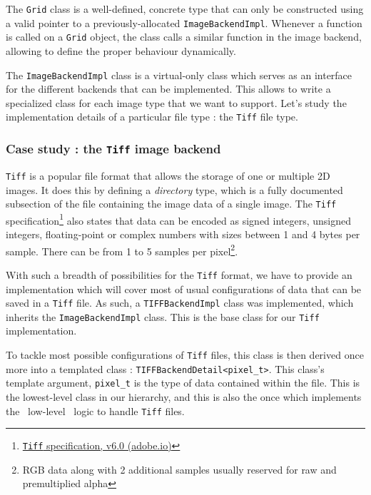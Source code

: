 {{		\myparspace

		The \texttt{Grid} class is a well-defined, concrete type that can only be constructed using a valid pointer to a previously-allocated \texttt{ImageBackendImpl}. Whenever a function is called on a \texttt{Grid} object, the class calls a similar function in the image backend, allowing to define the proper behaviour dynamically.\par
		The \texttt{ImageBackendImpl} class is a virtual-only class which serves as an interface for the different backends that can be implemented. This allows to write a specialized class for each image type that we want to support. Let's study the implementation details of a particular file type : the \texttt{Tiff} file type.

		\subsubsection{Case study : the \texttt{Tiff} image backend}
		{
			\texttt{Tiff} is a popular file format that allows the storage of one or multiple 2D images. It does this by defining a \textit{directory} type, which is a fully documented subsection of the file containing the image data of a single image. The \texttt{Tiff} specification\footnote{\href{https://www.adobe.io/content/dam/udp/en/open/standards/tiff/TIFF6.pdf}{\texttt{Tiff} specification, v6.0 (adobe.io)}} also states that data can be encoded as signed integers, unsigned integers, floating-point or complex numbers with sizes between 1 and 4 bytes per sample. There can be from 1 to 5 samples per pixel\footnote{RGB data along with 2 additional samples usually reserved for raw and premultiplied alpha}.

			With such a breadth of possibilities for the \texttt{Tiff} format, we have to provide an implementation which will cover most of usual configurations of data that can be saved in a \texttt{Tiff} file. As such, a \texttt{TIFFBackendImpl} class was implemented, which inherits the \texttt{ImageBackendImpl} class. This is the base class for our \texttt{Tiff} implementation.\par
			To tackle most possible configurations of \texttt{Tiff} files, this class is then derived once more into a templated class : \texttt{TIFFBackendDetail<pixel\_t>}. This class's template argument, \texttt{pixel\_t} is the type of data contained within the file. This is the lowest-level class in our hierarchy, and this is also the once which implements the \guillemotleft{}~low-level~\guillemotright{} logic to handle \texttt{Tiff} files.\par

}}}
